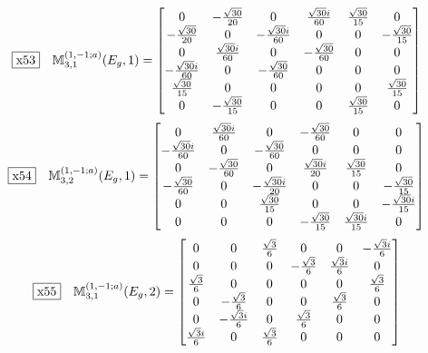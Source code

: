 \documentclass[fleqn,10pt,landscape]{jsarticle}
\begin{document}
\begin{dmath*}
\fbox{x53}\quad \mathbb{M}_{3,1}^{(1,-1;a)}(E_{g},1)=\begin{bmatrix} 0 & - \frac{\sqrt{30}}{20} & 0 & \frac{\sqrt{30} i}{60} & \frac{\sqrt{30}}{15} & 0 \\ - \frac{\sqrt{30}}{20} & 0 & - \frac{\sqrt{30} i}{60} & 0 & 0 & - \frac{\sqrt{30}}{15} \\ 0 & \frac{\sqrt{30} i}{60} & 0 & - \frac{\sqrt{30}}{60} & 0 & 0 \\ - \frac{\sqrt{30} i}{60} & 0 & - \frac{\sqrt{30}}{60} & 0 & 0 & 0 \\ \frac{\sqrt{30}}{15} & 0 & 0 & 0 & 0 & \frac{\sqrt{30}}{15} \\ 0 & - \frac{\sqrt{30}}{15} & 0 & 0 & \frac{\sqrt{30}}{15} & 0 \end{bmatrix}
\end{dmath*}
\begin{dmath*}
\fbox{x54}\quad \mathbb{M}_{3,2}^{(1,-1;a)}(E_{g},1)=\begin{bmatrix} 0 & \frac{\sqrt{30} i}{60} & 0 & - \frac{\sqrt{30}}{60} & 0 & 0 \\ - \frac{\sqrt{30} i}{60} & 0 & - \frac{\sqrt{30}}{60} & 0 & 0 & 0 \\ 0 & - \frac{\sqrt{30}}{60} & 0 & \frac{\sqrt{30} i}{20} & \frac{\sqrt{30}}{15} & 0 \\ - \frac{\sqrt{30}}{60} & 0 & - \frac{\sqrt{30} i}{20} & 0 & 0 & - \frac{\sqrt{30}}{15} \\ 0 & 0 & \frac{\sqrt{30}}{15} & 0 & 0 & - \frac{\sqrt{30} i}{15} \\ 0 & 0 & 0 & - \frac{\sqrt{30}}{15} & \frac{\sqrt{30} i}{15} & 0 \end{bmatrix}
\end{dmath*}
\begin{dmath*}
\fbox{x55}\quad \mathbb{M}_{3,1}^{(1,-1;a)}(E_{g},2)=\begin{bmatrix} 0 & 0 & \frac{\sqrt{3}}{6} & 0 & 0 & - \frac{\sqrt{3} i}{6} \\ 0 & 0 & 0 & - \frac{\sqrt{3}}{6} & \frac{\sqrt{3} i}{6} & 0 \\ \frac{\sqrt{3}}{6} & 0 & 0 & 0 & 0 & \frac{\sqrt{3}}{6} \\ 0 & - \frac{\sqrt{3}}{6} & 0 & 0 & \frac{\sqrt{3}}{6} & 0 \\ 0 & - \frac{\sqrt{3} i}{6} & 0 & \frac{\sqrt{3}}{6} & 0 & 0 \\ \frac{\sqrt{3} i}{6} & 0 & \frac{\sqrt{3}}{6} & 0 & 0 & 0 \end{bmatrix}
\end{dmath*}
\end{document}
